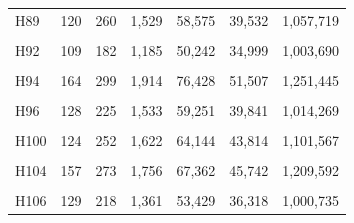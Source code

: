 \documentclass[
  a4paper,
  titlepage]{article}
\begin{document}
\begin{longtable}[t]{lllllll}
H89 & 120 & 260 & 1,529 & 58,575 & 39,532 & 1,057,719\\
 
\cellcolor{gray!6}{H91} & \cellcolor{gray!6}{97} & \cellcolor{gray!6}{195} & \cellcolor{gray!6}{1,186} & \cellcolor{gray!6}{47,707} & \cellcolor{gray!6}{32,614} & \cellcolor{gray!6}{838,699}\\
 
H92 & 109 & 182 & 1,185 & 50,242 & 34,999 & 1,003,690\\
 
\cellcolor{gray!6}{H93} & \cellcolor{gray!6}{98} & \cellcolor{gray!6}{207} & \cellcolor{gray!6}{1,307} & \cellcolor{gray!6}{49,993} & \cellcolor{gray!6}{33,875} & \cellcolor{gray!6}{846,020}\\
 
H94 & 164 & 299 & 1,914 & 76,428 & 51,507 & 1,251,445\\
 
\cellcolor{gray!6}{H95} & \cellcolor{gray!6}{115} & \cellcolor{gray!6}{217} & \cellcolor{gray!6}{1,402} & \cellcolor{gray!6}{54,404} & \cellcolor{gray!6}{36,862} & \cellcolor{gray!6}{978,770}\\
 
H96 & 128 & 225 & 1,533 & 59,251 & 39,841 & 1,014,269\\
 
\cellcolor{gray!6}{H97} & \cellcolor{gray!6}{93} & \cellcolor{gray!6}{181} & \cellcolor{gray!6}{1,129} & \cellcolor{gray!6}{45,616} & \cellcolor{gray!6}{31,293} & \cellcolor{gray!6}{873,382}\\
 
H100 & 124 & 252 & 1,622 & 64,144 & 43,814 & 1,101,567\\
 
\cellcolor{gray!6}{H102} & \cellcolor{gray!6}{117} & \cellcolor{gray!6}{237} & \cellcolor{gray!6}{1,554} & \cellcolor{gray!6}{59,592} & \cellcolor{gray!6}{40,642} & \cellcolor{gray!6}{1,064,380}\\
 
H104 & 157 & 273 & 1,756 & 67,362 & 45,742 & 1,209,592\\
 
\cellcolor{gray!6}{H105} & \cellcolor{gray!6}{89} & \cellcolor{gray!6}{170} & \cellcolor{gray!6}{1,108} & \cellcolor{gray!6}{44,750} & \cellcolor{gray!6}{30,708} & \cellcolor{gray!6}{767,769}\\
 
H106 & 129 & 218 & 1,361 & 53,429 & 36,318 & 1,000,735\\
 

\end{longtable}
\end{document}
